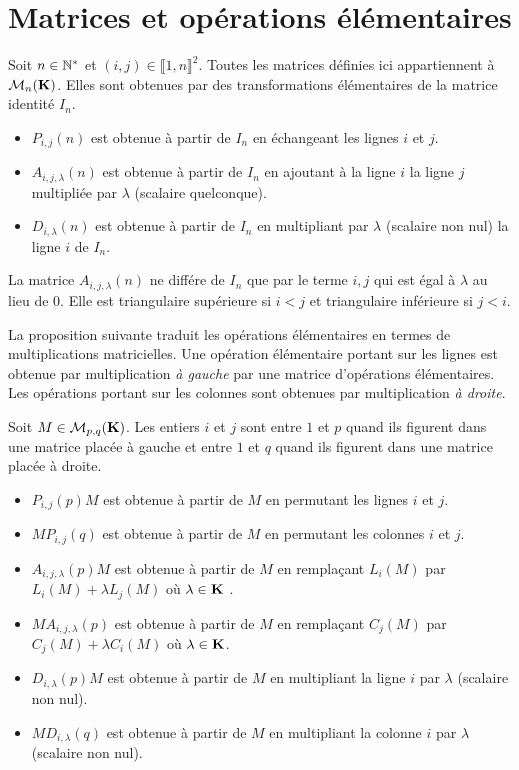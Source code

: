 \section{Matrices et opérations élémentaires}
\begin{defi}
 Soit $n \in \mathbb{N}^*$ et $(i,j)\in \llbracket 1,n \rrbracket^2$. Toutes les matrices définies ici appartiennent à $\mathcal{M}_n(\mathbf{K})$. Elles sont obtenues par des transformations élémentaires de la matrice identité $I_n$.\medskip
\begin{itemize}
 \item $P_{i,j}(n)$ est obtenue à partir de $I_n$ en échangeant les lignes $i$ et $j$.\medskip
 \item $A_{i,j,\lambda}(n)$ est obtenue à partir de $I_n$ en ajoutant à la ligne $i$ la ligne $j$ multipliée par $\lambda$ (scalaire quelconque).\medskip 
 \item $D_{i,\lambda}(n)$ est obtenue à partir de $I_n$ en multipliant par $\lambda$ (scalaire non nul) la ligne $i$ de $I_n$. 
\end{itemize}
\end{defi}
\begin{rem}
 La matrice $A_{i,j,\lambda}(n)$ ne différe de $I_n$ que par le terme $i,j$ qui est égal à $\lambda$ au lieu de $0$. Elle est triangulaire supérieure si $i < j$ et triangulaire inférieure si $j < i$.
\end{rem}
\noindent La proposition suivante traduit les opérations élémentaires en termes de multiplications matricielles. Une opération élémentaire portant sur les lignes est obtenue par multiplication \emph{à gauche} par une matrice d'opérations élémentaires. Les opérations portant sur les colonnes sont obtenues par multiplication \emph{à droite}.
\begin{prop}
 Soit $M\in \mathcal M_{p,q}(\mathbf{K})$. Les entiers $i$ et $j$ sont entre $1$ et $p$ quand ils figurent dans une matrice placée à gauche et entre $1$ et $q$ quand ils figurent dans une matrice placée à droite.  \medskip
\begin{itemize}
 \item $P_{i,j}(p)M$ est obtenue à partir de $M$ en permutant les lignes $i$ et $j$.\medskip
 \item $MP_{i,j}(q)$ est obtenue à partir de $M$ en permutant les colonnes $i$ et $j$.\medskip
 \item $A_{i,j,\lambda}(p)M$ est obtenue à partir de $M$ en remplaçant $L_i(M)$ par $L_i(M)+\lambda L_j(M)$ où $\lambda \in \mathbf{K}$ .\medskip
 \item $MA_{i,j,\lambda}(p)$ est obtenue à partir de $M$ en remplaçant $C_j(M)$ par $C_j(M)+\lambda C_i(M)$ où $\lambda \in \mathbf{K}$.\medskip
 \item $D_{i,\lambda}(p)M$ est obtenue à partir de $M$ en multipliant la ligne $i$ par $\lambda$ (scalaire non nul).\medskip
 \item $MD_{i,\lambda}(q)$ est obtenue à partir de $M$ en multipliant la colonne $i$ par $\lambda$ (scalaire non nul).
\end{itemize}
\end{prop}
